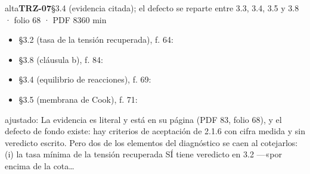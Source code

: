 \begin{ficha}{alta}{\casilla\textbf{TRZ-07}\quad{}\quad §3.4 (evidencia citada); el defecto se reparte entre 3.3, 3.4, 3.5 y 3.8 · folio 68 · PDF 83\hfill 60 min}
\begin{itemize}[leftmargin=1.2em,itemsep=1pt,topsep=1pt]
\item {\small §3.2 (tasa de la tensión recuperada), f. 64: }
\item {\small §3.8 (cláusula b), f. 84: }
\item {\small §3.4 (equilibrio de reacciones), f. 69: }
\item {\small §3.5 (membrana de Cook), f. 71: }
\end{itemize}
{\footnotesize\color{gris}ajustado: La evidencia es literal y está en su página (PDF 83, folio 68), y el defecto de fondo existe: hay criterios de aceptación de 2.1.6 con cifra medida y sin veredicto escrito. Pero dos de los elementos del diagnóstico se caen al cotejarlos: (i) la tasa mínima de la tensión recuperada SÍ tiene veredicto en 3.2 —«por encima de la cota…\par}
\end{ficha}
{\small{}\par}
